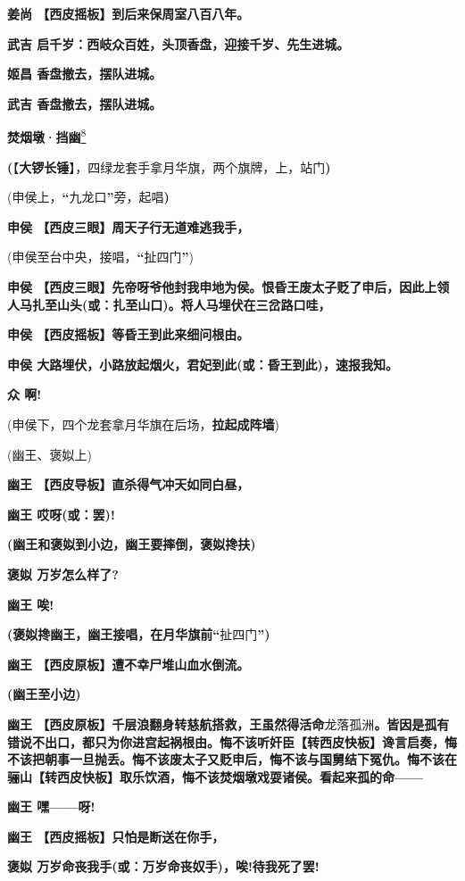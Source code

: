 \textbf{姜尚 【西皮摇板】到后来保周室八百八年。}

\textbf{武吉 启千岁：西岐众百姓，头顶香盘，迎接千岁、先生进城。}

\textbf{姬昌 香盘撤去，摆队进城。}

\textbf{武吉 香盘撤去，摆队进城。}

\textbf{焚烟墩·挡幽}\protect\hyperlink{fn8}{\textsuperscript{8}}

\textbf{(}【\textbf{大锣长锤}】，四绿龙套手拿月华旗，两个旗牌，上，站门\textbf{)}

(申侯上，\textbf{``}九龙口\textbf{''}旁，起唱\textbf{)}

\textbf{申侯 【西皮三眼】周天子行无道难逃我手，}

(申侯至台中央，接唱，\textbf{``}扯四门\textbf{''})

\textbf{申侯
【西皮三眼】先帝呀爷他封我申地为侯。恨昏王废太子贬了申后，因此上领人马扎至山头(或：扎至山口)。将人马埋伏在三岔路口哇，}

\textbf{申侯 【西皮摇板】等昏王到此来细问根由。}

\textbf{申侯 大路埋伏，小路放起烟火，君妃到此(或：昏王到此)，速报我知。}

\textbf{众 啊!}

(申侯下，四个龙套拿月华旗在后场，\textbf{拉起成阵墙})

(幽王、褒姒上)

\textbf{幽王 【西皮导板】直杀得气冲天如同白昼，}

\textbf{幽王 哎呀(或：罢)!}

\textbf{(幽王和褒姒到小边，幽王要摔倒，褒姒搀扶)}

\textbf{褒姒 万岁怎么样了?}

\textbf{幽王 唉!}

\textbf{(褒姒搀幽王，幽王接唱，在月华旗前``}扯四门\textbf{'')}

\textbf{幽王 【西皮原板】遭不幸尸堆山血水倒流。}

\textbf{(幽王至小边)}

\textbf{幽王
【西皮原板】千层浪翻身转慈航搭救，王虽然得活命}龙落孤洲\textbf{。皆因是孤有错说不出口，都只为你进宫起祸根由。悔不该听奸臣【转西皮快板】谗言启奏，悔不该把朝事一旦抛丢。悔不该废太子又贬申后，悔不该与国舅结下冤仇。悔不该在骊山【转西皮快板】取乐饮酒，悔不该焚烟墩戏耍诸侯。看起来孤的命------}

\textbf{幽王 嘿------呀!}

\textbf{幽王 【西皮摇板】只怕是断送在你手，}

\textbf{褒姒 万岁命丧我手(或：万岁命丧奴手)，唉!待我死了罢!}

